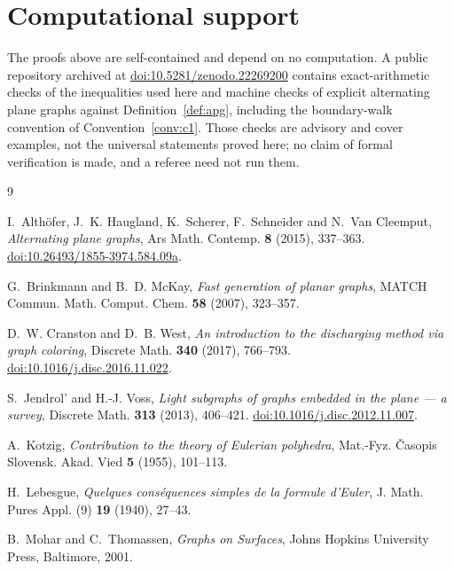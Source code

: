 \documentclass{baustms}
\theoremstyle{cupthm}
\theoremstyle{cupdefn}
\theoremstyle{cuprem}
\begin{document}
\section*{Computational support}

The proofs above are self-contained and depend on no computation. A public
repository archived at
\href{https://doi.org/10.5281/zenodo.22269200}{doi:10.5281/zenodo.22269200}
contains exact-arithmetic checks of the inequalities used here and machine checks
of explicit alternating plane graphs against Definition~\ref{def:apg}, including
the boundary-walk convention of Convention~\ref{conv:c1}. Those checks are
advisory and cover examples, not the universal statements proved here; no claim
of formal verification is made, and a referee need not run them.

\begin{thebibliography}{9}

I.~Alth\"ofer, J.~K. Haugland, K.~Scherer, F.~Schneider and N.~Van Cleemput,
\emph{Alternating plane graphs}, Ars Math. Contemp. \textbf{8} (2015),
337--363.
\href{https://doi.org/10.26493/1855-3974.584.09a}{doi:10.26493/1855-3974.584.09a}.

G.~Brinkmann and B.~D. McKay, \emph{Fast generation of planar graphs},
MATCH Commun. Math. Comput. Chem. \textbf{58} (2007), 323--357.

D.~W. Cranston and D.~B. West, \emph{An introduction to the discharging method
via graph coloring}, Discrete Math. \textbf{340} (2017), 766--793.
\href{https://doi.org/10.1016/j.disc.2016.11.022}{doi:10.1016/j.disc.2016.11.022}.

S.~Jendrol' and H.-J. Voss, \emph{Light subgraphs of graphs embedded in the
plane --- a survey}, Discrete Math. \textbf{313} (2013), 406--421.
\href{https://doi.org/10.1016/j.disc.2012.11.007}{doi:10.1016/j.disc.2012.11.007}.

A.~Kotzig, \emph{Contribution to the theory of Eulerian polyhedra},
Mat.-Fyz. \v{C}asopis Slovensk. Akad. Vied \textbf{5} (1955), 101--113.

H.~Lebesgue, \emph{Quelques cons\'equences simples de la formule d'Euler},
J. Math. Pures Appl. (9) \textbf{19} (1940), 27--43.

B.~Mohar and C.~Thomassen, \emph{Graphs on Surfaces}, Johns Hopkins University
Press, Baltimore, 2001.

\end{thebibliography}
\end{document}
